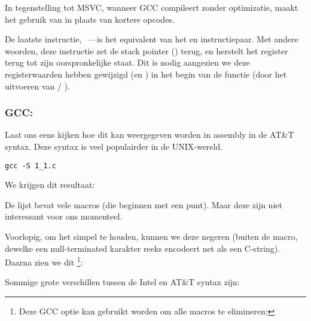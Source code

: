 \NLph{}

In tegenstelling tot MSVC, wanneer GCC compileert zonder optimizatie, maakt het gebruik van  in plaats van kortere opcodes.

De laatste instructie, \LEAVE~---is het equivalent van het  en  instructiepaar.
Met andere woorden, deze instructie zet de \gls{stack pointer} (\ESP) terug, en herstelt het \EBP register
terug tot zijn oorspronkelijke staat.
Dit is nodig aangezien we deze registerwaarden hebben gewijzigd (\ESP en \EBP) in het begin van de functie (door het uitvoeren van  / ).

\subsubsection{GCC: \ATTSyntax}
\label{ATT_syntax}

Laat ons eens kijken hoe dit kan weergegeven worden in assembly in de AT\&T syntax.
Deze syntax is veel populairder in de UNIX-wereld.

\begin{lstlisting}[caption=\NLph{} GCC 4.7.3]
gcc -S 1_1.c
\end{lstlisting}

We krijgen dit resultaat:



De lijst bevat vele macros (die beginnen met een punt). Maar deze zijn niet interessant voor ons momenteel.

Voorlopig, om het simpel te houden, kunnen we deze negeren (buiten de  macro, dewelke
een null-terminated karakter reeks encodeert net als een C-string). Daarna zien we dit
\footnote{Deze GCC optie kan gebruikt worden om alle  macros te elimineren: }:



\myindex{\ATTSyntax}
\myindex{\IntelSyntax}
Sommige grote verschillen tussen de Intel en AT\&T syntax zijn:

